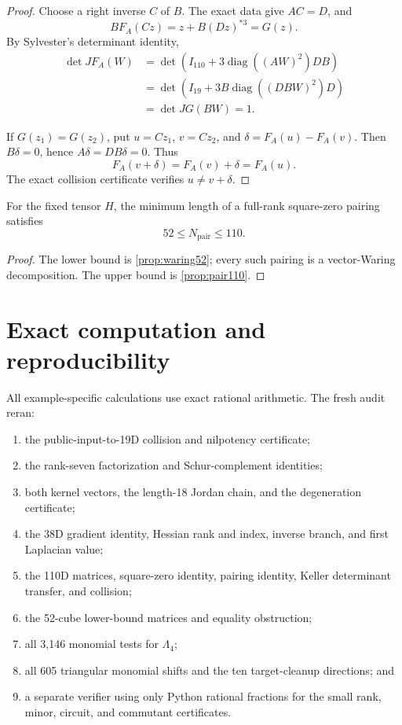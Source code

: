 \documentclass[11pt,reqno]{amsart}
\begin{document}
\begin{proof}
Choose a right inverse \(C\) of \(B\).  The exact data give \(AC=D\), and
\[
B F_A(Cz)=z+B(Dz)^{*3}=G(z).
\]
By Sylvester's determinant identity,
\begin{align*}
\det JF_A(W)
&=\det\left(I_{110}
+3\operatorname{diag}((AW)^2)DB\right)\\
&=\det\left(I_{19}
+3B\operatorname{diag}((DBW)^2)D\right)\\
&=\det JG(BW)=1.
\end{align*}

If \(G(z_1)=G(z_2)\), put \(u=Cz_1\), \(v=Cz_2\), and
\(\delta=F_A(u)-F_A(v)\).  Then \(B\delta=0\), hence
\(A\delta=DB\delta=0\).  Thus
\[
F_A(v+\delta)=F_A(v)+\delta=F_A(u).
\]
The exact collision certificate verifies \(u\ne v+\delta\).
\end{proof}

\begin{corollary}
\label{cor:pair-interval}
For the fixed tensor \(H\), the minimum length of a full-rank square-zero
pairing satisfies
\[
52\le N_{\mathrm{pair}}\le110.
\]
\end{corollary}

\begin{proof}
The lower bound is \cref{prop:waring52}; every such pairing is a
vector-Waring decomposition.  The upper bound is \cref{prop:pair110}.
\end{proof}

\section{Exact computation and reproducibility}
\label{sec:computation}

All example-specific calculations use exact rational arithmetic.  The fresh
audit reran:
\begin{enumerate}[label=(\arabic*)]
\item the public-input-to-19D collision and nilpotency certificate;
\item the rank-seven factorization and Schur-complement identities;
\item both kernel vectors, the length-18 Jordan chain, and the degeneration
certificate;
\item the 38D gradient identity, Hessian rank and index, inverse branch, and
first Laplacian value;
\item the 110D matrices, square-zero identity, pairing identity, Keller
determinant transfer, and collision;
\item the 52-cube lower-bound matrices and equality obstruction;
\item all 3,146 monomial tests for \(\Lambda_4\);
\item all 605 triangular monomial shifts and the ten target-cleanup
directions; and
\item a separate verifier using only Python rational fractions for the small
rank, minor, circuit, and commutant certificates.
\end{enumerate}
\end{document}
